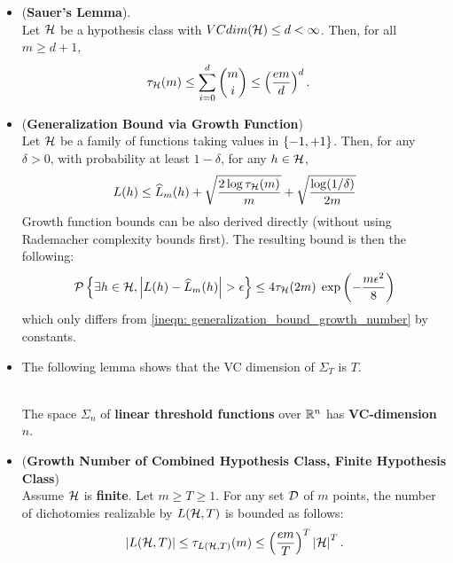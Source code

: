 \documentclass[11pt]{article}
\begin{document}
\begin{itemize}
\item \begin{lemma} (\textbf{Sauer's Lemma}). \citep{shalev2014understanding, mohri2018foundations}\\
Let ${\mathcal H}$ be a hypothesis class with $VCdim({\mathcal H}) \le d < \infty$. Then, for all $m \ge d + 1$, 
\begin{align}
\tau_{{\mathcal H}}(m) &\le \sum_{i=0}^{d}{{m}\choose{i}} \le \left(\frac{em}{d}\right)^{d}.  \label{eqn: sauer_lemma}
\end{align}
\end{lemma}

\item 
\begin{proposition} \label{cor: generalization_bound_growth}   (\textbf{Generalization Bound via Growth Function})  \citep{mohri2018foundations}\\
Let ${\mathcal H}$ be a family of functions taking values in $\left\{-1, +1\right\}$.  Then, for any $\delta > 0$, with probability at least $1 - \delta$, for any $h \in {\mathcal H}$,
\begin{align}
L(h) \le \widehat{L}_{m}(h) + \sqrt{\frac{2 \log \tau_{{\mathcal H}}(m)}{m}} +\sqrt{\frac{\log(1/\delta)}{2m}} \label{ineqn: generalization_bound_growth_number}
\end{align}
Growth function bounds can be also derived directly (without using Rademacher complexity bounds first). The resulting bound is then the following:
\begin{align}
{\mathcal P}\left\{\exists h\in {\mathcal H}, \left\lvert L(h) - \widehat{L}_{m}(h) \right\rvert > \epsilon \right\}  \le 4\tau_{{\mathcal H}}(2m)\;\exp\left(-\frac{m\epsilon^2}{8}\right) \label{ineqn: generalization_bound_growth_number_2}
\end{align}
which only differs from \eqref{ineqn: generalization_bound_growth_number} by constants.
\end{proposition}



\item The following lemma shows that the VC dimension of $\Sigma_T$ is $T$.
\begin{lemma} \citep{schapire2012boosting}\\
The space $\Sigma_n$ of \textbf{linear threshold functions} over ${\mathbb R}^n$ has \textbf{VC-dimension} $n$.
\end{lemma}

\item \begin{lemma} (\textbf{Growth Number of Combined Hypothesis Class, Finite Hypothesis Class}) \citep{schapire2012boosting, shalev2014understanding} \\
Assume ${\mathcal H}$ is \textbf{finite}. Let $m \ge T \ge 1$. For any set ${\mathcal D}$ of $m$ points, the number of dichotomies realizable by $L({\mathcal H}, T)$ is bounded as follows:
\begin{align}
\left\lvert L({\mathcal H}, T) \right\rvert \le \tau_{L({\mathcal H}, T)}(m) \le \left(\frac{em}{T}\right)^T \left\lvert {\mathcal H} \right\rvert^T.  \label{ineqn: growth_fun_ensemble_finite}
\end{align}
\end{lemma}


\end{itemize}
\end{document}
